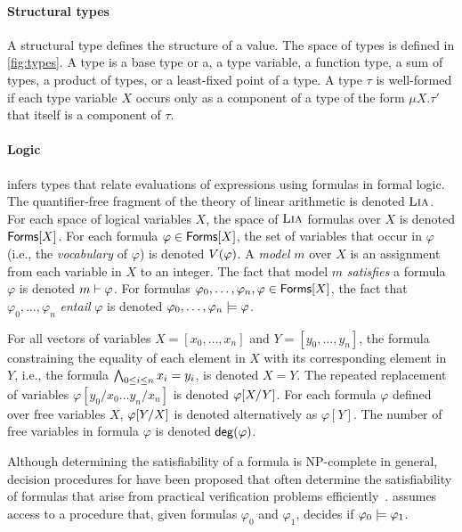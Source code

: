 \paragraph{Structural types}
%
A structural type defines the structure of a value.
%
The space of types is defined in \autoref{fig:types}.
%
A type is a base type or a, a type variable, a function type, a sum of
types, a product of types, or a least-fixed point of a type.
%
A type $\tau$ is well-formed if each type variable $X$ occurs only as
a component of a type of the form $\mu X. \tau'$ that itself is a
component of $\tau$.

\paragraph{Logic}
%
\sys infers types that relate evaluations of expressions using
formulas in formal logic.
%
The quantifier-free fragment of the theory of linear arithmetic is
denoted $\lia$.
%
For each space of logical variables $X$, the space of $\lia$ formulas
over $X$ is denoted $\formulas{ X }$.
%
For each formula $\varphi \in \formulas{X}$, the set of variables that
occur in $\varphi$ (i.e., the \emph{vocabulary} of $\varphi$) is
denoted $\vocab(\varphi)$.
A \lia \emph{model} $m$ over $X$ is an assignment from each variable
in $X$ to an integer.
%
The fact that model $m$ \emph{satisfies} a formula $\varphi$ is
denoted $m \sats \varphi$.
%
For formulas $\varphi_0, \ldots, \varphi_n, \varphi \in \formulas{X}$,
the fact that $\varphi_0, \ldots, \varphi_n$ \emph{entail} $\varphi$
is denoted $\varphi_0, \ldots, \varphi_n \entails \varphi$.

For all vectors of variables $X = [ x_0, \ldots, x_n ]$ and $Y = [
y_0, \ldots, y_n ]$, the \lia formula constraining the equality of
each element in $X$ with its corresponding element in $Y$, i.e., the
formula $\bigland_{0 \leq i \leq n} x_i = y_i$, is denoted $X = Y$.
%
The repeated replacement of variables $\varphi[ y_0 / x_0 \ldots y_{n}
/ x_{n} ]$ is denoted $\replace{\varphi}{Y}{X}$.
%
For each formula $\varphi$ defined over free variables $X$,
$\replace{\varphi}{X}{Y}$ is denoted alternatively as $\varphi[Y]$.
%
The number of free variables in formula $\varphi$ is denoted
$\degreeof(\varphi)$.

Although determining the satisfiability of a \lia formula is
NP-complete in general, decision procedures for \lia have been
proposed that often determine the satisfiability of formulas that
arise from practical verification problems
efficiently~\cite{demoura08}.
%
\sys assumes access to a procedure that, given \lia formulas
$\varphi_0$ and $\varphi_1$, decides if $\varphi_0 \entails
\varphi_1$.


